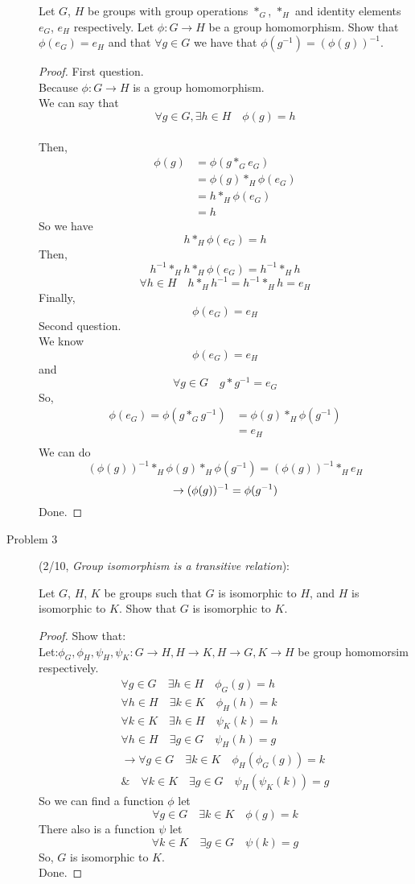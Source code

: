 \documentclass{article}
\begin{document}
\begin{description}
Let $G$, $H$ be groups with group operations $*_G$, $*_H$ and identity
elements $e_G$, $e_H$ respectively. Let $\phi:G\to H$ be a group
homomorphism. Show that $\phi(e_G)=e_H$ and that $\forall g\in G$ we
have that $\phi(g^{-1})=(\phi(g))^{-1}$.
\begin{proof}
  First question.\\Because $\phi:G\to H$ is a group homomorphism.\\
  We can say that $$\forall g \in G,\exists h \in H \quad \phi(g)=h$$\\
  Then,
  \begin{align*}
    \phi(g)&=\phi(g*_G e_G)\\
    &=\phi(g)*_H \phi(e_G)\\
    &=h*_H \phi(e_G)\\
    &=h
  \end{align*}
  So we have $$h*_H\phi(e_G)=h$$
  Then,$$h^{-1}*_Hh*_H \phi(e_G)=h^{-1}*_H h$$
  $$\forall h \in H \quad h*_Hh^{-1}=h^{-1}*_Hh=e_H$$
  Finally,$$\phi(e_G)=e_H$$
  Second question.\\
  We know $$\phi(e_G)=e_H $$
   and $$\forall g \in G \quad g*g^{-1}=e_G $$
  So,
  \begin{align*}
    \phi(e_G)=\phi(g*_G g^{-1})&=\phi(g)*_H \phi(g^{-1}) \\
    &=e_H\\
  \end{align*}
  We can do $$(\phi(g))^{-1}*_H\phi(g)*_H\phi(g^{-1})=(\phi(g))^{-1}*_He_H$$
    $$\to (\phi(g))^{-1}=\phi(g^{-1})\\$$
  Done.
\end{proof}
\item[Problem 3](2/10, \textit{Group isomorphism is a transitive relation}):

Let $G$, $H$, $K$ be groups such that $G$ is isomorphic to $H$, and
$H$ is isomorphic to $K$. Show that $G$ is isomorphic to $K$.
\begin{proof}
 Show that:\\
 Let:$\phi_G,\phi_H,\psi_H,\psi_K:G\to H,H\to K , H\to G, K\to H$ \quad be group homomorsim respectively.
 \begin{align*}
   \forall g \in G \quad \exists h \in H \quad\phi_G(g)=h\\
   \forall h \in H \quad \exists k \in K \quad\phi_H(h)=k\\
   \forall k \in K \quad \exists h \in H \quad\psi_K(k)=h\\
   \forall h \in H \quad \exists g \in G \quad\psi_H(h)=g\\
   \to \forall g \in G \quad \exists k \in K \quad \phi_H(\phi_G(g))=k\\
   \&\quad \forall k \in K \quad \exists g \in G \quad \psi_H(\psi_K(k))=g
 \end{align*}
 So we can find a function $\phi$ let $$\forall g \in G \quad \exists k \in K \quad \phi(g)=k$$
 There also is a function $\psi$ let $$\forall k \in K \quad \exists g \in G \quad \psi(k)=g$$
 So, $G$ is isomorphic to $K$.\\
 Done.
\end{proof}

\end{description}
\end{document}
